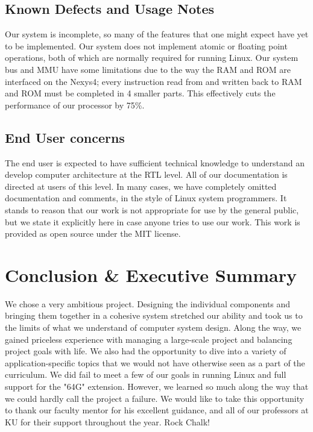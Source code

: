 \documentclass{article}
\begin{document}
\subsection{Known Defects and Usage Notes}
Our system is incomplete, so many of the features that one might expect have yet to be implemented.  Our system does not implement atomic or floating point operations, both of which are normally required for running Linux.  Our system bus and MMU have some limitations due to the way the RAM and ROM are interfaced on the Nexys4; every instruction read from and written back to RAM and ROM must be completed in 4 smaller parts.  This effectively cuts the performance of our processor by 75\%.

\subsection{End User concerns}
The end user is expected to have sufficient technical knowledge to understand an develop computer architecture at the RTL level.  All of our documentation is directed at users of this level.  In many cases, we have completely omitted documentation and comments, in the style of Linux system programmers.  It stands to reason that our work is not appropriate for use by the general public, but we state it explicitly here in case anyone tries to use our work.  This work is provided as open source under the MIT license.


\section{Conclusion \& Executive Summary}
We chose a very ambitious project. Designing the individual components and bringing them together in a cohesive system stretched our ability and took us to the limits of what we understand of computer system design.  Along the way, we gained priceless experience with managing a large-scale project and balancing project goals with life.  We also had the opportunity to dive into a variety of application-specific topics that we would not have otherwise seen as a part of the curriculum.  We did fail to meet a few of our goals in running Linux and full support for the "64G" extension.  However, we learned so much along the way that we could hardly call the project a failure.  We would like to take this opportunity to thank our faculty mentor for his excellent guidance, and all of our professors at KU for their support throughout the year.  Rock Chalk!
\printbibliography
\end{document}
